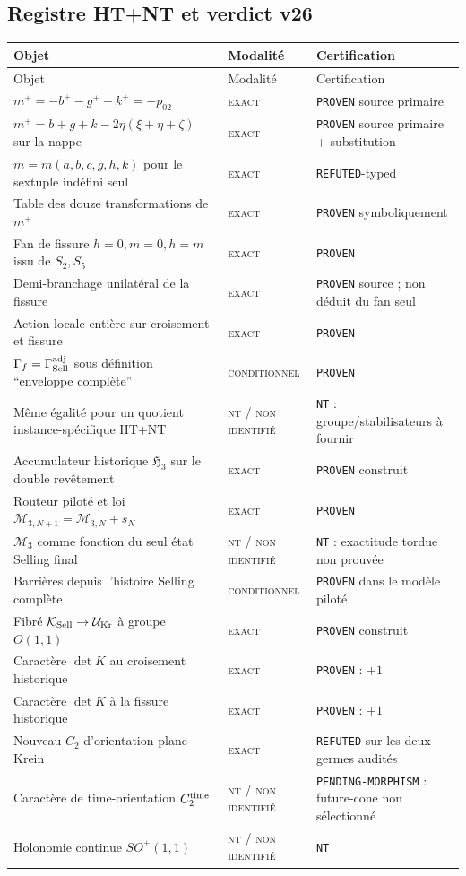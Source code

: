 \documentclass[11pt,a4paper]{article}
\newcommand{\statusExact}{\textsc{exact}}
\newcommand{\statusCond}{\textsc{conditionnel}}
\newcommand{\statusNT}{\textsc{nt / non identifié}}
\newcommand{\certProven}{\texttt{PROVEN}}
\newcommand{\certRefuted}{\texttt{REFUTED}}
\newcommand{\certPending}{\texttt{PENDING-MORPHISM}}
\newcommand{\certNT}{\texttt{NT}}
\begin{document}
\subsection{Registre HT+NT et verdict v26}

\begin{longtable}{p{}p{}p{}}
\toprule
Objet & Modalité & Certification\\
\midrule
\endfirsthead
\toprule
Objet & Modalité & Certification\\
\midrule
\endhead
$m^+=-b^+-g^+-k^+=-p_{02}$ & \statusExact & \certProven{} source primaire\\
$m^+=b+g+k-2\eta(\xi+\eta+\zeta)$ sur la nappe & \statusExact & \certProven{} source primaire + substitution\\
$m=m(a,b,c,g,h,k)$ pour le sextuple indéfini seul & \statusExact & \certRefuted{}-typed\\
Table des douze transformations de $m^+$ & \statusExact & \certProven{} symboliquement\\
Fan de fissure $h=0,m=0,h=m$ issu de $S_2,S_5$ & \statusExact & \certProven\\
Demi-branchage unilatéral de la fissure & \statusExact & \certProven{} source ; non déduit du fan seul\\
Action locale entière sur croisement et fissure & \statusExact & \certProven\\
$\Gamma_f=\Gamma_{\rm Sell}^{\rm adj}$ sous définition ``enveloppe complète'' & \statusCond & \certProven\\
Même égalité pour un quotient instance-spécifique HT+NT & \statusNT & \certNT{} : groupe/stabilisateurs à fournir\\
Accumulateur historique $\mathfrak H_3$ sur le double revêtement & \statusExact & \certProven{} construit\\
Routeur piloté et loi $\mathcal M_{3,N+1}=\mathcal M_{3,N}+s_N$ & \statusExact & \certProven\\
$\mathcal M_3$ comme fonction du seul état Selling final & \statusNT & \certNT{} : exactitude tordue non prouvée\\
Barrières depuis l'histoire Selling complète & \statusCond & \certProven{} dans le modèle piloté\\
Fibré $\mathcal K_{\rm Sell}\to\mathcal U_{\rm Kr}$ à groupe $O(1,1)$ & \statusExact & \certProven{} construit\\
Caractère $\det K$ au croisement historique & \statusExact & \certProven{} : $+1$\\
Caractère $\det K$ à la fissure historique & \statusExact & \certProven{} : $+1$\\
Nouveau $C_2$ d'orientation plane Krein & \statusExact & \certRefuted{} sur les deux germes audités\\
Caractère de time-orientation $C_2^{\rm time}$ & \statusNT & \certPending{} : future-cone non sélectionné\\
Holonomie continue $SO^+(1,1)$ & \statusNT & \certNT\\
\bottomrule
\end{longtable}
\end{document}
